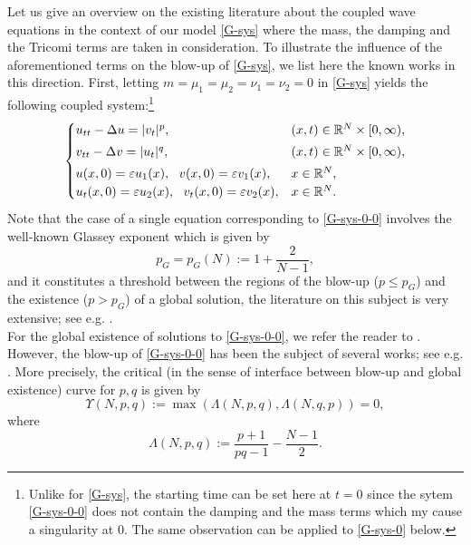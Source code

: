 \documentclass[12pt,leqno]{amsart}
\numberwithin{equation}{section}
\theoremstyle{remark}
\def\R{{\mathbb{R}}}
\def\d{\displaystyle}
\def\e{{\varepsilon}}
\begin{document}
Let us give an overview on the existing literature about the coupled wave equations in the context of our model \eqref{G-sys} where the mass, the damping and the Tricomi terms are taken in consideration. To illustrate the influence of the  aforementioned terms on the blow-up of \eqref{G-sys}, we  list  here the  known works in this direction. 
First, letting $m=\mu_1 = \mu_2 = \nu_1=\nu_2= 0$ in \eqref{G-sys} yields the following coupled system:\footnote{ Unlike for \eqref{G-sys}, the starting time can be set here at $t=0$ since  the  sytem \eqref{G-sys-0-0} does not contain the damping and the mass terms which my cause a singularity at $0$. The same observation can be applied to \eqref{G-sys-0} below.}
\begin{align}\label{G-sys-0-0}
\begin{cases} u_{tt}-\Delta u =|v_t |^p, &   
 (x,t) \in \R^N\times[0,\infty),   \vspace{.1cm}\\
 v_{tt}-\Delta v =|u_t |^q, &   
 (x,t) \in \R^N\times[0,\infty), \vspace{.1cm}\\
u(x,0)=\e u_1(x), \ \ v(x,0)=\e  v_1(x), & x\in \mathbb{R}^N, \\ u_t(x,0)=\e u_2(x), \ \  v_t(x,0)=\varepsilon v_2(x), & x\in \mathbb{R}^N.
\end{cases}
\end{align}
Note that the case of a single equation corresponding to \eqref{G-sys-0-0} involves the well-known Glassey exponent which is given by
\begin{equation}\label{Glassey}
p_G=p_G(N):=1+\frac{2}{N-1},
\end{equation}
and it constitutes a threshold between the regions of the blow-up ($p \le p_G$) and the existence ($p>p_G$) of a global solution, the literature on this subject is very extensive; see e.g. \cite{Hidano1,Hidano2,John1,Sideris,Tzvetkov,Zhou1}.\\
For the global existence of solutions to  \eqref{G-sys-0-0}, we refer the reader to \cite{Kubo}. However, the blow-up of \eqref{G-sys-0-0} has been the subject of several works; see e.g. \cite{Dao-Reissig,Ikeda-sys,Palmieri1,Palmieri-Takamura-arx}.  More precisely, the critical (in the sense of interface between blow-up and global existence) curve for $p,q$ is given by
\begin{equation}\label{crit-curve-0}
\Upsilon(N,p,q):=\max (\Lambda(N,p,q), \Lambda(N,q,p))=0,
\end{equation}
where 
\begin{equation}\label{Lambda}
\d \Lambda(N,p,q):= \frac{p+1}{pq-1}-\frac{N-1}{2}.
\end{equation}
\end{document}
